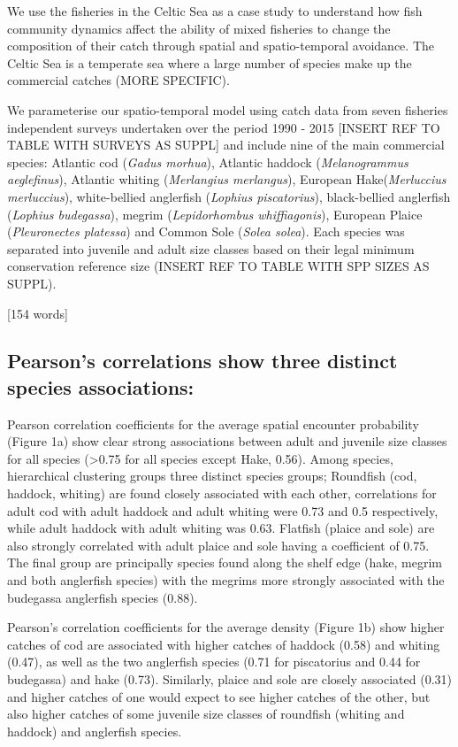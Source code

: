 \documentclass{nature}
\begin{document}
\begin{linenumbers}
We use the fisheries in the Celtic Sea as a case study to understand how fish
community dynamics affect the ability of mixed fisheries to change the
composition of their catch through spatial and spatio-temporal avoidance. The
Celtic Sea is a temperate sea where a large number of species make up the
commercial catches (MORE SPECIFIC).

We parameterise our spatio-temporal model using catch data from seven fisheries
independent surveys undertaken over the period 1990 - 2015 [INSERT REF TO TABLE
WITH SURVEYS AS SUPPL] and include nine of the main commercial species:
Atlantic cod (\textit{Gadus morhua}), Atlantic haddock (\textit{Melanogrammus
	aeglefinus}), Atlantic whiting (\textit{Merlangius merlangus}),
European Hake(\textit{Merluccius merluccius}), white-bellied anglerfish
(\textit{Lophius piscatorius}), black-bellied anglerfish (\textit{Lophius
	budegassa}), megrim (\textit{Lepidorhombus whiffiagonis}), European
Plaice (\textit{Pleuronectes platessa}) and Common Sole (\textit{Solea solea}).
Each species was separated into juvenile and adult size classes based on their
legal minimum conservation reference size (INSERT REF TO TABLE WITH SPP SIZES
AS SUPPL). 

[154 words]

\subsection{Pearson's correlations show three distinct species associations:}
Pearson correlation coefficients for the average spatial encounter probability
(Figure 1a) show clear strong associations between adult and juvenile
size classes for all species (\textgreater 0.75 for all species except Hake,
0.56).  Among species, hierarchical clustering groups three distinct species
groups; Roundfish (cod, haddock, whiting) are found closely associated with
each other, correlations for adult cod with adult haddock and adult whiting
were 0.73 and 0.5 respectively, while adult haddock with adult whiting was
0.63. Flatfish (plaice and sole) are also strongly correlated with adult plaice
and sole having a coefficient of 0.75. The final group are principally species
found along the shelf edge (hake, megrim and both anglerfish species) with the
megrims more strongly associated with the budegassa anglerfish species (0.88).

Pearson's correlation coefficients for the average density (Figure 1b) show
higher catches of cod are associated with higher catches of haddock (0.58) and
whiting (0.47), as well as the two anglerfish species (0.71 for piscatorius and
0.44 for budegassa) and hake (0.73). Similarly, plaice and sole are closely
associated (0.31) and higher catches of one would expect to see higher catches
of the other, but also higher catches of some juvenile size classes of
roundfish (whiting and haddock) and anglerfish species.


\end{linenumbers}
\end{document}
